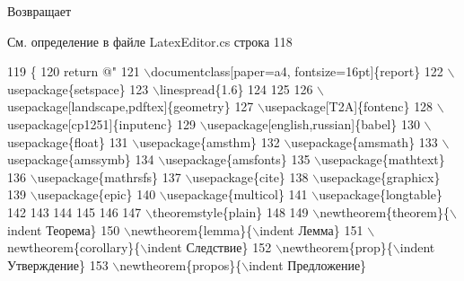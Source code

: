 \begin{DoxyReturn}{Возвращает}

\end{DoxyReturn}


См. определение в файле Latex\+Editor.\+cs строка 118


\begin{DoxyCode}
119         \{
120             \textcolor{keywordflow}{return} \textcolor{stringliteral}{@"}
121 \textcolor{stringliteral}{\(\backslash\)documentclass[paper=a4, fontsize=16pt]\{report\}
}
122 \textcolor{stringliteral}{\(\backslash\)usepackage\{setspace\}
}
123 \textcolor{stringliteral}{\(\backslash\)linespread\{1.6\}
}
124 \textcolor{stringliteral}{}
125 \textcolor{stringliteral}{}
126 \textcolor{stringliteral}{\(\backslash\)usepackage[landscape,pdftex]\{geometry\}
}
127 \textcolor{stringliteral}{\(\backslash\)usepackage[T2A]\{fontenc\}
}
128 \textcolor{stringliteral}{\(\backslash\)usepackage[cp1251]\{inputenc\}
}
129 \textcolor{stringliteral}{\(\backslash\)usepackage[english,russian]\{babel\}
}
130 \textcolor{stringliteral}{\(\backslash\)usepackage\{float\}
}
131 \textcolor{stringliteral}{\(\backslash\)usepackage\{amsthm\}
}
132 \textcolor{stringliteral}{\(\backslash\)usepackage\{amsmath\}
}
133 \textcolor{stringliteral}{\(\backslash\)usepackage\{amssymb\}
}
134 \textcolor{stringliteral}{\(\backslash\)usepackage\{amsfonts\}
}
135 \textcolor{stringliteral}{\(\backslash\)usepackage\{mathtext\}
}
136 \textcolor{stringliteral}{\(\backslash\)usepackage\{mathrsfs\}
}
137 \textcolor{stringliteral}{\(\backslash\)usepackage\{cite\}
}
138 \textcolor{stringliteral}{\(\backslash\)usepackage\{graphicx\}
}
139 \textcolor{stringliteral}{\(\backslash\)usepackage\{epic\}
}
140 \textcolor{stringliteral}{\(\backslash\)usepackage\{multicol\}
}
141 \textcolor{stringliteral}{\(\backslash\)usepackage\{longtable\}
}
142 \textcolor{stringliteral}{}
143 \textcolor{stringliteral}{}
144 \textcolor{stringliteral}{}
145 \textcolor{stringliteral}{}
146 \textcolor{stringliteral}{}
147 \textcolor{stringliteral}{\(\backslash\)theoremstyle\{plain\}
}
148 \textcolor{stringliteral}{%
}
149 \textcolor{stringliteral}{\(\backslash\)newtheorem\{theorem\}\{\(\backslash\)indent Теорема\}
}
150 \textcolor{stringliteral}{\(\backslash\)newtheorem\{lemma\}\{\(\backslash\)indent Лемма\}
}
151 \textcolor{stringliteral}{\(\backslash\)newtheorem\{corollary\}\{\(\backslash\)indent Следствие\}
}
152 \textcolor{stringliteral}{\(\backslash\)newtheorem\{prop\}\{\(\backslash\)indent Утверждение\}
}
153 \textcolor{stringliteral}{\(\backslash\)newtheorem\{propos\}\{\(\backslash\)indent Предложение\}
}
\end{DoxyCode}
